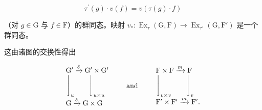 \[
\tau^ {\prime} (g) \cdot v (f) = v (\tau (g) \cdot f)
\]

（对 \(g \in \mathrm{G}\) 与 \(f \in \mathrm{F}\)）的群同态。映射 \(v_{*} : \operatorname{Ex}_{\tau}(\mathrm{G}, \mathrm{F}) \to \operatorname{Ex}_{\tau'}(\mathrm{G}, \mathrm{F}')\) 是一个群同态。

这由诸图的交换性得出

\[
\begin{array}{l} \mathrm{G} ^ {\prime} \xrightarrow {\delta} \mathrm{G} ^ {\prime} \times \mathrm{G} ^ {\prime} \\ \Biggl \downarrow_ {u} \qquad \Biggl \downarrow_ {u \times u} \\ \mathrm{G} \xrightarrow {\delta} \mathrm{G} \times \mathrm{G} \end{array} \qquad \text {and} \qquad \begin{array}{l} \mathrm{F} \times \mathrm{F} \xrightarrow {m} \mathrm{F} \\ \Biggl \downarrow_ {v \times v} \qquad \Biggl \downarrow_ {v} \\ \mathrm{F} ^ {\prime} \times \mathrm{F} ^ {\prime} \xrightarrow {m} \mathrm{F} ^ {\prime}. \end{array}
\]

